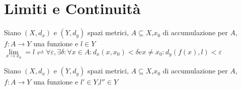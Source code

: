 \section{Limiti e Continuità}
\begin{definition}
	Siano $(X,d_x)$ e $(Y,d_y)$ spazi metrici, $A\subseteq{X}$,$x_0$ di accumulazione per $A$, $f:A\rightarrow{Y}$ una funzione e $l\in{Y}$ \\
	$\lim\limits_{x \rightarrow x_0} = l \rightleftharpoons \forall{\varepsilon},\exists\delta : \forall{x}\in A : d_x(x,x_0)<\delta e x\ne{x_0} : d_y(f(x),l)<\varepsilon$
\end{definition}

\begin{proposition}
	Siano $(X,d_x)$ e $(Y,d_y)$ spazi metrici, $A\subseteq{X}$,$x_0$ di accumulazione per $A$, $f:A\rightarrow{Y}$ una funzione e $l'\in{Y}$,$l''\in{Y}$
\end{proposition}


